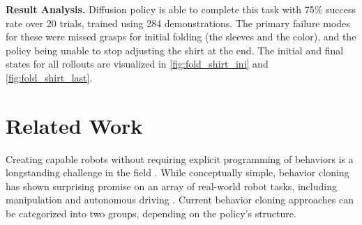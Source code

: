 \documentclass[Afour,sageh,times]{sagej}
\newcommand\todo[1]{\textcolor{red}{[TODO: #1]}}
\begin{document}
\textbf{Result Analysis.} Diffusion policy is able to complete this task with 75\% success rate over 20 trials, trained using 284 demonstrations. The primary failure modes for these were missed grasps for initial folding (the sleeves and the color), and the policy being unable to stop adjusting the shirt at the end. The initial and final states for all rollouts are visualized in \ref{fig:fold_shirt_ini} and \ref{fig:fold_shirt_last}.




\section{Related Work}
Creating capable robots without requiring explicit programming of behaviors is a longstanding challenge in the field \cite{atkeson1997robot, argall2009survey, ravichandar2020recent}.
While conceptually simple, behavior cloning has shown surprising promise on an array of real-world robot tasks, including manipulation \cite{zhang2018deep, florence2019self, mandlekar2020learning, mandlekar2020iris, zeng2021transporter, rahmatizadeh2018vision, avigal2022speedfolding} and autonomous driving \cite{pomerleau1988alvinn, bojarski2016end}. Current behavior cloning approaches can be categorized into two groups, depending on the policy's structure.

\end{document}
